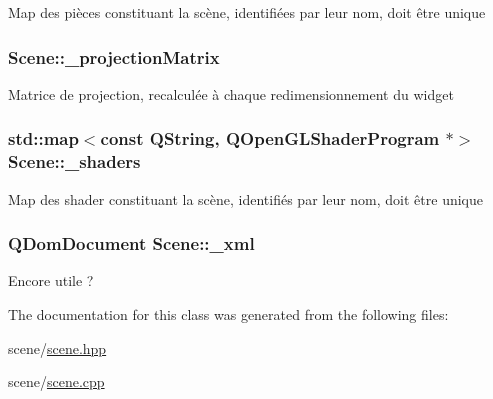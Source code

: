 Map des pièces constituant la scène, identifiées par leur nom, doit être unique \hypertarget{class_scene_a7db3394191c0a07e6bdc456a53ac8ece}{
\subsubsection[{\+\_\+projection\+Matrix}]{ Scene\+::\+\_\+projection\+Matrix\hspace{0.3cm}{\ttfamily [private]}}}\label{class_scene_a7db3394191c0a07e6bdc456a53ac8ece}
Matrice de projection, recalculée à chaque redimensionnement du widget \hypertarget{class_scene_aee3789138ea10dca4999644ca8565541}{
\subsubsection[{\+\_\+shaders}]{\setlength{\rightskip}{0pt plus 5cm}std\+::map$<$const Q\+String, Q\+Open\+G\+L\+Shader\+Program $\ast$$>$ Scene\+::\+\_\+shaders\hspace{0.3cm}{\ttfamily [private]}}}\label{class_scene_aee3789138ea10dca4999644ca8565541}
Map des shader constituant la scène, identifiés par leur nom, doit être unique \hypertarget{class_scene_a72a13a904d01e99834ba24ca655b9813}{
\subsubsection[{\+\_\+xml}]{\setlength{\rightskip}{0pt plus 5cm}Q\+Dom\+Document Scene\+::\+\_\+xml\hspace{0.3cm}{\ttfamily [private]}}}\label{class_scene_a72a13a904d01e99834ba24ca655b9813}
Encore utile ? 

The documentation for this class was generated from the following files\+:\begin{DoxyCompactItemize}
\item 
scene/\hyperlink{scene_8hpp}{scene.\+hpp}\item 
scene/\hyperlink{scene_8cpp}{scene.\+cpp}\end{DoxyCompactItemize}
